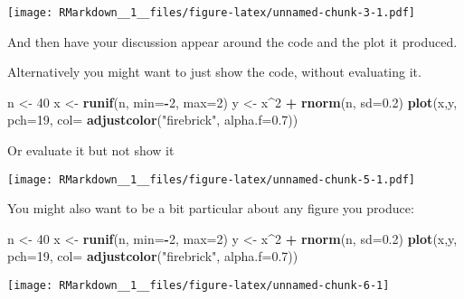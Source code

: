 \documentclass[]{article}
\newenvironment{Shaded}{\begin{snugshade}}{\end{snugshade}}
\newcommand{\KeywordTok}[1]{\textcolor[rgb]{0.13,0.29,0.53}{\textbf{#1}}}
\newcommand{\DataTypeTok}[1]{\textcolor[rgb]{0.13,0.29,0.53}{#1}}
\newcommand{\DecValTok}[1]{\textcolor[rgb]{0.00,0.00,0.81}{#1}}
\newcommand{\FloatTok}[1]{\textcolor[rgb]{0.00,0.00,0.81}{#1}}
\newcommand{\StringTok}[1]{\textcolor[rgb]{0.31,0.60,0.02}{#1}}
\newcommand{\OperatorTok}[1]{\textcolor[rgb]{0.81,0.36,0.00}{\textbf{#1}}}
\newcommand{\NormalTok}[1]{#1}
\begin{document}
\texttt{[image: RMarkdown\_\_1\_\_files/figure-latex/unnamed-chunk-3-1.pdf]}

And then have your discussion appear around the code and the plot it
produced.

Alternatively you might want to just show the code, without evaluating
it.

\begin{Shaded}
\begin{Highlighting}[]
\NormalTok{n <-}\StringTok{ }\DecValTok{40}
\NormalTok{x <-}\StringTok{ }\KeywordTok{runif}\NormalTok{(n, }\DataTypeTok{min=}\OperatorTok{-}\DecValTok{2}\NormalTok{, }\DataTypeTok{max=}\DecValTok{2}\NormalTok{)}
\NormalTok{y <-}\StringTok{ }\NormalTok{x}\OperatorTok{^}\DecValTok{2} \OperatorTok{+}\StringTok{ }\KeywordTok{rnorm}\NormalTok{(n, }\DataTypeTok{sd=}\FloatTok{0.2}\NormalTok{)}
\KeywordTok{plot}\NormalTok{(x,y, }\DataTypeTok{pch=}\DecValTok{19}\NormalTok{, }\DataTypeTok{col=} \KeywordTok{adjustcolor}\NormalTok{(}\StringTok{"firebrick"}\NormalTok{, }\DataTypeTok{alpha.f=}\FloatTok{0.7}\NormalTok{))}
\end{Highlighting}
\end{Shaded}

Or evaluate it but not show it

\texttt{[image: RMarkdown\_\_1\_\_files/figure-latex/unnamed-chunk-5-1.pdf]}

You might also want to be a bit particular about any figure you produce:

\begin{Shaded}
\begin{Highlighting}[]
\NormalTok{n <-}\StringTok{ }\DecValTok{40}
\NormalTok{x <-}\StringTok{ }\KeywordTok{runif}\NormalTok{(n, }\DataTypeTok{min=}\OperatorTok{-}\DecValTok{2}\NormalTok{, }\DataTypeTok{max=}\DecValTok{2}\NormalTok{)}
\NormalTok{y <-}\StringTok{ }\NormalTok{x}\OperatorTok{^}\DecValTok{2} \OperatorTok{+}\StringTok{ }\KeywordTok{rnorm}\NormalTok{(n, }\DataTypeTok{sd=}\FloatTok{0.2}\NormalTok{)}
\KeywordTok{plot}\NormalTok{(x,y, }\DataTypeTok{pch=}\DecValTok{19}\NormalTok{, }\DataTypeTok{col=} \KeywordTok{adjustcolor}\NormalTok{(}\StringTok{"firebrick"}\NormalTok{, }\DataTypeTok{alpha.f=}\FloatTok{0.7}\NormalTok{))}
\end{Highlighting}
\end{Shaded}

\begin{center}\texttt{[image: RMarkdown\_\_1\_\_files/figure-latex/unnamed-chunk-6-1]} \end{center}
\end{document}
